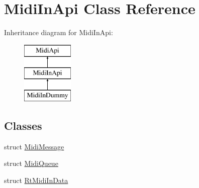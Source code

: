 \hypertarget{class_midi_in_api}{}\section{Midi\+In\+Api Class Reference}
\label{class_midi_in_api}
Inheritance diagram for Midi\+In\+Api\+:\begin{figure}[H]
\begin{center}
\leavevmode
\includegraphics[height=3.000000cm]{class_midi_in_api}
\end{center}
\end{figure}
\subsection*{Classes}
\begin{DoxyCompactItemize}
\item 
struct \hyperlink{struct_midi_in_api_1_1_midi_message}{Midi\+Message}
\item 
struct \hyperlink{struct_midi_in_api_1_1_midi_queue}{Midi\+Queue}
\item 
struct \hyperlink{struct_midi_in_api_1_1_rt_midi_in_data}{Rt\+Midi\+In\+Data}
\end{DoxyCompactItemize}
